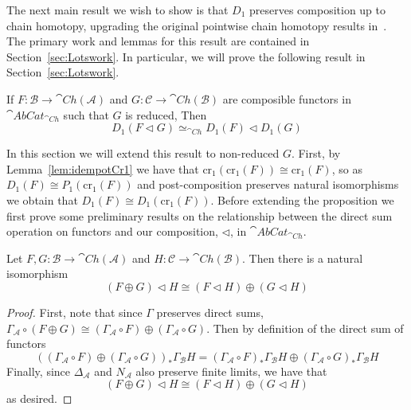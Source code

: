 The next main result we wish to show is that $D_1$ preserves composition up to  chain homotopy, upgrading the original pointwise chain homotopy results in~\cite{BJORT}. The primary work and lemmas for this result are contained in Section~\ref{sec:Lotswork}. In particular, we will prove the following result in Section~\ref{sec:Lotswork}.

\begin{prop}[label=prop:5.7]
    If $F:\mathcal{B}\to \cat{Ch}(\mathcal{A})$ and $G:\mathcal{C}\to \cat{Ch}(\mathcal{B})$ are composible functors in $\cat{AbCat}_{\cat{Ch}}$ such that $G$ is reduced, Then
    \begin{equation*}
        D_1(F\lhd G) \simeq_{\cat{Ch}} D_1(F)\lhd D_1(G)
    \end{equation*}
\end{prop}

In this section we will extend this result to non-reduced $G$. First, by Lemma~\ref{lem:idempotCr1} we have that $\text{cr}_1(\text{cr}_1(F))\cong \text{cr}_1(F)$, so as $D_1(F) \cong P_1(\text{cr}_1(F))$ and post-composition preserves natural isomorphisms we obtain that $D_1(F) \cong D_1(\text{cr}_1(F))$. Before extending the proposition we first prove some preliminary results on the relationship between the direct sum operation on functors and our composition, $\lhd$, in $\cat{AbCat}_{\cat{Ch}}$. 

\begin{lem}[label=lem:compDirSum]
    Let $F,G:\mathcal{B}\to \cat{Ch}(\mathcal{A})$ and $H:\mathcal{C}\to \cat{Ch}(\mathcal{B})$. Then there is a natural isomorphism
    \begin{equation*}
        (F\oplus G)\lhd H\cong (F\lhd H)\oplus (G\lhd H)
    \end{equation*}
\end{lem}
\begin{proof}
    First, note that since $\Gamma$ preserves direct sums, $\Gamma_\mathcal{A}\circ (F\oplus G)\cong (\Gamma_\mathcal{A}\circ F)\oplus (\Gamma_\mathcal{A}\circ G)$. Then by definition of the direct sum of functors
    \begin{equation*}
        ((\Gamma_\mathcal{A}\circ F)\oplus (\Gamma_\mathcal{A}\circ G))_*\Gamma_\mathcal{B}H = (\Gamma_\mathcal{A}\circ F)_*\Gamma_\mathcal{B}H\oplus (\Gamma_\mathcal{A}\circ G)_*\Gamma_\mathcal{B}H
    \end{equation*}
    Finally, since $\Delta_\mathcal{A}$ and $N_\mathcal{A}$ also preserve finite limits, we have that 
    \begin{equation*}
        (F\oplus G)\lhd H \cong (F\lhd H)\oplus (G\lhd H)
    \end{equation*}
    as desired.
\end{proof}

